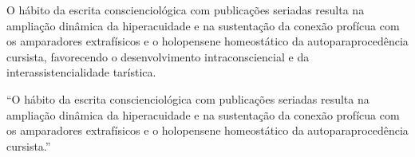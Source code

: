 \documentclass{gescons}
\begin{document}
\begin{multicols}{2}
O hábito da escrita conscienciológica com publicações seriadas resulta na ampliação dinâmica da hiperacuidade e na sustentação da conexão profícua com os amparadores extrafísicos e o holopensene homeostático da autoparaprocedência cursista, favorecendo o desenvolvimento intraconsciencial e da interassistencialidade tarística.

\begin{pullquote}
    ``O hábito da escrita conscienciológica com publicações seriadas resulta na ampliação dinâmica da hiperacuidade e na sustentação da conexão profícua com os amparadores extrafísicos e o holopensene homeostático da autoparaprocedência cursista.''
\end{pullquote}
    
    \end{multicols}
\end{document}
